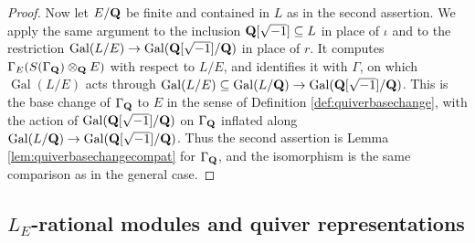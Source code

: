 \documentclass[a4paper,12pt,reqno]{amsart}
\newcommand{\QQ}{{\rm\bf Q}}
\DeclareMathOperator{\Gal}{\mathrm {Gal}}
\theoremstyle{plain}
\theoremstyle{remark}
\begin{document}
\begin{proof}
    Now let $E/\QQ$ be finite and contained in $L$ as in the second assertion. We apply the same argument to the inclusion $\QQ[\sqrt{-1}]\subseteq L$ in place of $\iota$ and to the restriction $\Gal(L/E)\to\Gal(\QQ[\sqrt{-1}]/\QQ)$ in place of $r$. It computes $\Gamma_E(S(\Gamma_\QQ)\otimes_\QQ E)$ with respect to $L/E$, and identifies it with $\Gamma$, on which $\Gal(L/E)$ acts through $\Gal(L/E)\subseteq\Gal(L/\QQ)\to\Gal(\QQ[\sqrt{-1}]/\QQ)$. This is the base change of $\Gamma_\QQ$ to $E$ in the sense of Definition \ref{def:quiverbasechange}, with the action of $\Gal(\QQ[\sqrt{-1}]/\QQ)$ on $\Gamma_\QQ$ inflated along $\Gal(L/\QQ)\to\Gal(\QQ[\sqrt{-1}]/\QQ)$. Thus the second assertion is Lemma \ref{lem:quiverbasechangecompat} for $\Gamma_\QQ$, and the isomorphism is the same comparison as in the general case.
    \end{proof}

    \subsection{$L_E$-rational modules and quiver representations}
\end{document}
